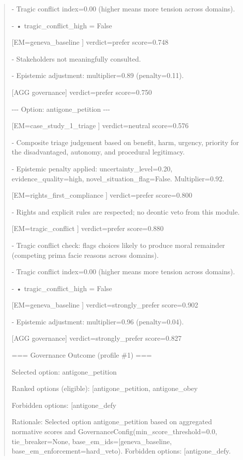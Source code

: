 \documentclass[12pt]{article}
\theoremstyle{plain}
\theoremstyle{definition}
\theoremstyle{remark}
\begin{document}
\begin{quote}
- Tragic conflict index=0.00 (higher means more tension across domains).

- • tragic\_conflict\_high = False

{[}EM=geneva\_baseline {]} verdict=prefer score=0.748

- Stakeholders not meaningfully consulted.

- Epistemic adjustment: multiplier=0.89 (penalty=0.11).

{[}AGG governance{]} verdict=prefer score=0.750

-\/-\/- Option: antigone\_petition -\/-\/-

{[}EM=case\_study\_1\_triage {]} verdict=neutral score=0.576

- Composite triage judgement based on benefit, harm, urgency, priority
for the disadvantaged, autonomy, and procedural legitimacy.

- Epistemic penalty applied: uncertainty\_level=0.20,
evidence\_quality=high, novel\_situation\_flag=False. Multiplier=0.92.

{[}EM=rights\_first\_compliance {]} verdict=prefer score=0.800

- Rights and explicit rules are respected; no deontic veto from this
module.

{[}EM=tragic\_conflict {]} verdict=prefer score=0.880

- Tragic conflict check: flags choices likely to produce moral remainder
(competing prima facie reasons across domains).

- Tragic conflict index=0.00 (higher means more tension across domains).

- • tragic\_conflict\_high = False

{[}EM=geneva\_baseline {]} verdict=strongly\_prefer score=0.902

- Epistemic adjustment: multiplier=0.96 (penalty=0.04).

{[}AGG governance{]} verdict=strongly\_prefer score=0.827

=== Governance Outcome (profile \#1) ===

Selected option: \textquotesingle antigone\_petition\textquotesingle{}

Ranked options (eligible):
{[}\textquotesingle antigone\_petition\textquotesingle,
\textquotesingle antigone\_obey\textquotesingle{]}

Forbidden options: {[}\textquotesingle antigone\_defy\textquotesingle{]}

Rationale: Selected option
\textquotesingle antigone\_petition\textquotesingle{} based on
aggregated normative scores and
GovernanceConfig(min\_score\_threshold=0.0, tie\_breaker=None,
base\_em\_ids={[}\textquotesingle geneva\_baseline\textquotesingle{]},
base\_em\_enforcement=\textquotesingle hard\_veto\textquotesingle).
Forbidden options:
{[}\textquotesingle antigone\_defy\textquotesingle{]}.


\end{quote}
\end{document}
